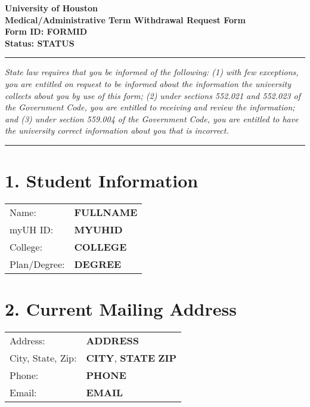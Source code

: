 \documentclass[12pt]{article}
\begin{document}
\begin{center}
  \textbf{\Large University of Houston}\\[0.2cm]
  \textbf{\large Medical/Administrative Term Withdrawal Request Form}\\[0.2cm]
  \textbf{Form ID: FORMID}\\[0.2cm]
  \textbf{Status: STATUS}
\end{center}

\hrule
\vspace{0.5cm}

\noindent\textit{State law requires that you be informed of the following: (1) with few exceptions, you are entitled on request to be informed about the information the university collects about you by use of this form; (2) under sections 552.021 and 552.023 of the Government Code, you are entitled to receiving and review the information; and (3) under section 559.004 of the Government Code, you are entitled to have the university correct information about you that is incorrect.}

\vspace{0.5cm}
\hrule
\vspace{0.5cm}

\section*{1. Student Information}
\begin{tabular}{ll}
Name: & \textbf{FULLNAME} \\
myUH ID: & \textbf{MYUHID} \\
College: & \textbf{COLLEGE} \\
Plan/Degree: & \textbf{DEGREE} \\
\end{tabular}

\vspace{0.5cm}

\section*{2. Current Mailing Address}
\begin{tabular}{ll}
Address: & \textbf{ADDRESS} \\
City, State, Zip: & \textbf{CITY}, \textbf{STATE} \textbf{ZIP} \\
Phone: & \textbf{PHONE} \\
Email: & \textbf{EMAIL} \\
\end{tabular}
\end{document}
